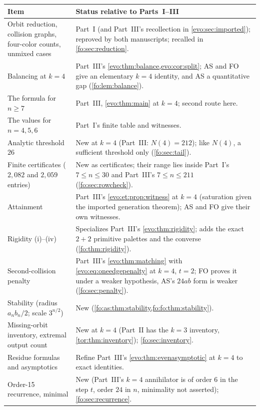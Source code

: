 \documentclass[11pt,a4paper]{article}
\numberwithin{equation}{section}
\theoremstyle{definition}
\theoremstyle{remark}
\begin{document}
\begin{center}
\small
\begin{tabular}{@{}>{\raggedright}p{}>{\raggedright\arraybackslash}p{}@{}}
\toprule
Item & Status relative to Parts~I--III\\
\midrule
Orbit reduction, collision graphs, four-color counts, unmixed cases &
Part~I (and Part~III's recollection in \cref{evo:sec:imported}); reproved by
both manuscripts; recalled in \cref{fo:sec:reduction}.\\[2pt]
Balancing at $k=4$ & Part~III's \cref{evo:thm:balance,evo:cor:split}; AS and
FO give an elementary $k=4$ identity, and AS a quantitative gap
(\cref{fo:lem:balance}).\\[2pt]
The formula for $n\ge7$ & Part~III, \cref{evo:thm:main} at $k=4$; second
route here.\\[2pt]
The values for $n=4,5,6$ & Part~I's finite table and witnesses.\\[2pt]
Analytic threshold $26$ & New at $k=4$ (Part~III: $N(4)=212$); like $N(4)$, a
sufficient threshold only (\cref{fo:sec:tail}).\\[2pt]
Finite certificates ($2{,}082$ and $2{,}059$ entries) & New as certificates;
their range lies inside Part~I's $7\le n\le30$ and Part~III's $7\le n\le211$
(\cref{fo:sec:rowcheck}).\\[2pt]
Attainment & Part~III's \cref{evo:et:prop:witness} at $k=4$ (saturation given
the imported generation theorem); AS and FO give their own witnesses.\\[2pt]
Rigidity (i)--(iv) & Specializes Part~III's \cref{evo:thm:rigidity}; adds the
exact $2+2$ primitive palettes and the converse (\cref{fo:thm:rigidity}).\\[2pt]
Second-collision penalty & Part~III's \cref{evo:thm:matching} with
\eqref{evo:eq:oneedgepenalty} at $k=4$, $t=2$; FO proves it under a weaker
hypothesis, AS's $24ab$ form is weaker (\cref{fo:sec:penalty}).\\[2pt]
Stability (radius $a_nb_n/2$; scale $3^{n/2}$) & New
(\cref{fo:as:thm:stability,fo:fo:thm:stability}).\\[2pt]
Missing-orbit inventory, extremal output count & New at $k=4$ (Part~II has the
$k=3$ inventory, \cref{tor:thm:inventory}); \cref{fo:sec:inventory}.\\[2pt]
Residue formulas and asymptotics & Refine Part~III's
\cref{evo:thm:evenasymptotic} at $k=4$ to exact identities.\\[2pt]
Order-15 recurrence, minimal & New (Part~III's $k=4$ annihilator is of order
$6$ in the step $t$, order $24$ in $n$, minimality not asserted);
\cref{fo:sec:recurrence}.\\
\bottomrule
\end{tabular}
\end{center}
\end{document}
